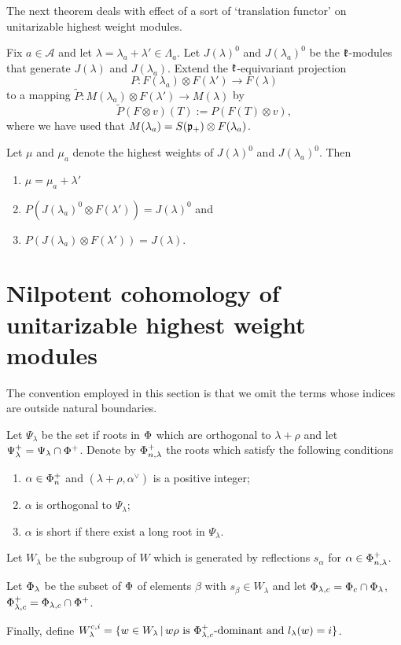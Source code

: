 The next theorem  deals with effect of a sort of `translation functor' on unitarizable highest weight modules.
\begin{theorem}
 Fix $a\in\mathcal{A}$ and let $\lambda = \lambda_a + \lambda'\in\Lambda_a$. Let $J(\lambda)^0$ and $J(\lambda_a)^0$ be the $\mathfrak{k}$-modules that generate $J(\lambda)$ and $J(\lambda_a)$. Extend the $\mathfrak{k}$-equivariant projection \[P:F(\lambda_a)\otimes F(\lambda') \to F(\lambda)\] to a mapping $\widetilde{P}:M(\lambda_a) \otimes F(\lambda') \to M(\lambda)$ by \[\widetilde{P}(F\otimes v) (T) := P(F(T)\otimes v),\]
  where we have used that $M(\lambda_a) = S(\mathfrak{p}_+)\otimes F(\lambda_a)$.

Let $\mu$ and $\mu_a$ denote the highest weights of  $J(\lambda)^0$ and $J(\lambda_a)^0$. Then
 \begin{enumerate}
  \item $\mu  = \mu_a+\lambda'$
  \item $P(J(\lambda_a)^0\otimes F(\lambda')) = J(\lambda)^0$ and 
  \item $P(J(\lambda_a)\otimes F(\lambda')) = J(\lambda)$.
 \end{enumerate}
\end{theorem}

\section{Nilpotent cohomology of unitarizable highest weight modules}

The convention employed in this section is that we omit the terms whose indices are outside natural boundaries. 

\begin{definition}\label{def:cohomology_roots}
Let $\Psi_\lambda$ be the set if roots in $\Phi$ which are orthogonal to $\lambda+\rho$ and let $\Psi_\lambda^+ = \Psi_\lambda \cap \Phi^+$. Denote by $\Phi_{n,\lambda}^+$ the roots which satisfy the following conditions
 \begin{enumerate}
    \item $\alpha \in \Phi_n^+$ and $(\lambda+\rho,\alpha^\vee)$ is a positive integer;
    \item $\alpha$ is orthogonal to $\Psi_\lambda$;
    \item $\alpha$ is short if there exist a long root in $\Psi_\lambda$.
 \end{enumerate}
 
 Let $W_\lambda$ be the subgroup of $W$ which is generated by reflections $s_\alpha$ for $\alpha\in \Phi_{n,\lambda}^+$.
 
 Let $\Phi_\lambda$ be the subset of $\Phi$ of elements $\beta$ with $s_\beta\in W_\lambda$ and let $\Phi_{\lambda,c} = \Phi_c \cap \Phi_\lambda$, $\Phi_{\lambda,c}^+ = \Phi_{\lambda,c} \cap \Phi^+$.
 
 Finally, define  $W^{c,i}_\lambda = \{ w \in W_\lambda \, |\, w \rho \text{ is } \Phi^+_{\lambda, c}\text{-dominant and } l_\lambda(w)=i \}$.
\end{definition}

